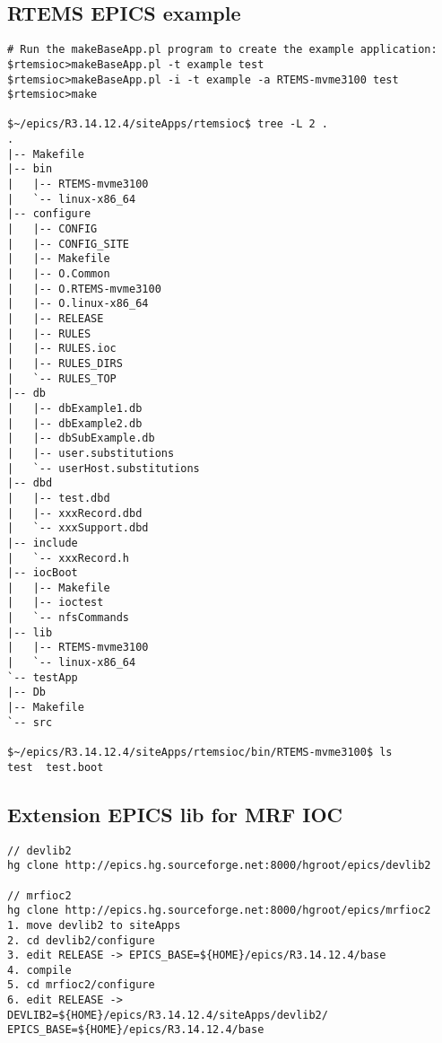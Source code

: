 \documentclass[11pt
  , a4paper
  , article
  , oneside
]{memoir}
\begin{document}
\subsection*{RTEMS EPICS example}
\begin{lstlisting}[style=termstyle]
# Run the makeBaseApp.pl program to create the example application:
$rtemsioc>makeBaseApp.pl -t example test
$rtemsioc>makeBaseApp.pl -i -t example -a RTEMS-mvme3100 test
$rtemsioc>make

$~/epics/R3.14.12.4/siteApps/rtemsioc$ tree -L 2 .
.
|-- Makefile
|-- bin
|   |-- RTEMS-mvme3100
|   `-- linux-x86_64
|-- configure
|   |-- CONFIG
|   |-- CONFIG_SITE
|   |-- Makefile
|   |-- O.Common
|   |-- O.RTEMS-mvme3100
|   |-- O.linux-x86_64
|   |-- RELEASE
|   |-- RULES
|   |-- RULES.ioc
|   |-- RULES_DIRS
|   `-- RULES_TOP
|-- db
|   |-- dbExample1.db
|   |-- dbExample2.db
|   |-- dbSubExample.db
|   |-- user.substitutions
|   `-- userHost.substitutions
|-- dbd
|   |-- test.dbd
|   |-- xxxRecord.dbd
|   `-- xxxSupport.dbd
|-- include
|   `-- xxxRecord.h
|-- iocBoot
|   |-- Makefile
|   |-- ioctest
|   `-- nfsCommands
|-- lib
|   |-- RTEMS-mvme3100
|   `-- linux-x86_64
`-- testApp
|-- Db
|-- Makefile
`-- src

$~/epics/R3.14.12.4/siteApps/rtemsioc/bin/RTEMS-mvme3100$ ls
test  test.boot
\end{lstlisting}


\subsection*{Extension EPICS lib for MRF IOC}
\begin{lstlisting}[style=termstyle]
// devlib2
hg clone http://epics.hg.sourceforge.net:8000/hgroot/epics/devlib2

// mrfioc2
hg clone http://epics.hg.sourceforge.net:8000/hgroot/epics/mrfioc2
1. move devlib2 to siteApps
2. cd devlib2/configure
3. edit RELEASE -> EPICS_BASE=${HOME}/epics/R3.14.12.4/base
4. compile
5. cd mrfioc2/configure
6. edit RELEASE -> 
DEVLIB2=${HOME}/epics/R3.14.12.4/siteApps/devlib2/
EPICS_BASE=${HOME}/epics/R3.14.12.4/base
\end{lstlisting}

\clearpage


\end{document}
